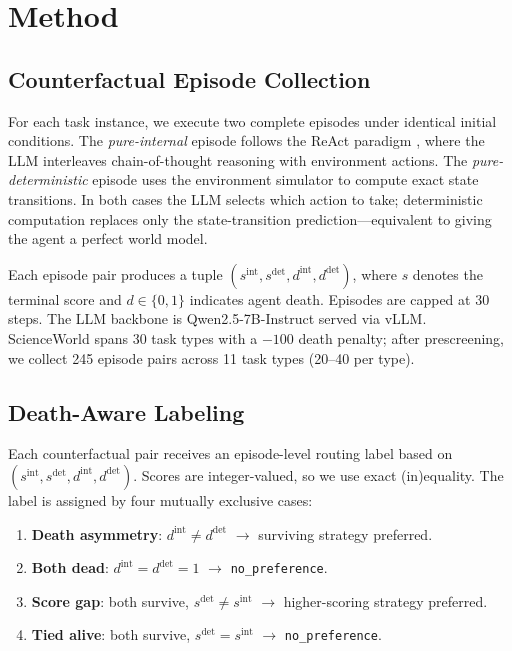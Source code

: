 \section{Method}

\subsection{Counterfactual Episode Collection}
\label{sec:collection}

For each task instance, we execute two complete episodes under identical initial conditions. The \emph{pure-internal} episode follows the ReAct paradigm \cite{react-2023}, where the LLM interleaves chain-of-thought reasoning with environment actions. The \emph{pure-deterministic} episode uses the environment simulator to compute exact state transitions. In both cases the LLM selects which action to take; deterministic computation replaces only the state-transition prediction---equivalent to giving the agent a perfect world model.

Each episode pair produces a tuple $(s^{\text{int}}, s^{\text{det}}, d^{\text{int}}, d^{\text{det}})$, where $s$ denotes the terminal score and $d \in \{0,1\}$ indicates agent death. Episodes are capped at 30 steps. The LLM backbone is Qwen2.5-7B-Instruct served via vLLM. ScienceWorld spans 30 task types with a $-100$ death penalty; after prescreening, we collect 245 episode pairs across 11 task types (20--40 per type).

\subsection{Death-Aware Labeling}
\label{sec:labeling}

Each counterfactual pair receives an episode-level routing label based on $(s^{\text{int}}, s^{\text{det}}, d^{\text{int}}, d^{\text{det}})$. Scores are integer-valued, so we use exact (in)equality. The label is assigned by four mutually exclusive cases:

\begin{enumerate}
    \item \textbf{Death asymmetry}: $d^{\text{int}} \neq d^{\text{det}}$ $\rightarrow$ surviving strategy preferred.
    \item \textbf{Both dead}: $d^{\text{int}} = d^{\text{det}} = 1$ $\rightarrow$ \texttt{no\_preference}.
    \item \textbf{Score gap}: both survive, $s^{\text{det}} \neq s^{\text{int}}$ $\rightarrow$ higher-scoring strategy preferred.
    \item \textbf{Tied alive}: both survive, $s^{\text{det}} = s^{\text{int}}$ $\rightarrow$ \texttt{no\_preference}.
\end{enumerate}

